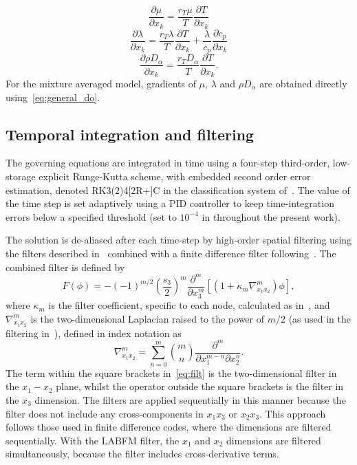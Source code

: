 \documentclass[notitlepage]{revtex4-1}
\begin{document}
\begin{equation}\frac{\partial\mu}{\partial{x}_{k}}=\frac{r_{T}\mu}{T}\frac{\partial{T}}{\partial{x}_{k}}\end{equation}
\begin{equation}\frac{\partial\lambda}{\partial{x}_{k}}=\frac{r_{T}\lambda}{T}\frac{\partial{T}}{\partial{x}_{k}}+\frac{\lambda}{c_{p}}\frac{\partial{c_{p}}}{\partial{x}_{k}}\end{equation}
\begin{equation}\frac{\partial\rho{D}_{\alpha}}{\partial{x}_{k}}=\frac{r_{T}D_{\alpha}}{T}\frac{\partial{T}}{\partial{x}_{k}}.\end{equation}
For the mixture averaged model, gradients of $\mu$, $\lambda$ and $\rho{D}_{\alpha}$ are obtained directly using~\eqref{eq:general_do}.

\subsection{Temporal integration and filtering}

The governing equations are integrated in time using a four-step third-order, low-storage explicit Runge-Kutta scheme, with embedded second order error estimation, denoted RK3(2)4[2R+]C in the classification system of~\citet{kennedy_2000}. The value of the time step is set adaptively using a PID controller to keep time-integration errors below a specified threshold (set to $10^{-4}$ in throughout the present work). 

The solution is de-aliased after each time-step by high-order spatial filtering using the filters described in~\cite{king_2022} combined with a finite difference filter following~\cite{kennedy_1994}. 
The combined filter is defined by
\begin{equation}F\left(\phi\right)=-\left(-1\right)^{m/2}\left(\frac{s_{3}}{2}\right)^{m}\frac{\partial^{m}}{\partial{x}_{3}^{m}}\left[\left(1+\kappa_{m}\nabla_{x_{1}x_{2}}^{m}\right)\phi\right]\label{eq:filt},\end{equation}
where $\kappa_{m}$ is the filter coefficient, specific to each node, calculated as in~\cite{king_2022}, and $\nabla_{x_{1}x_{2}}^{m}$ is the two-dimensional Laplacian raised to the power of $m/2$ (as used in the filtering in~\cite{king_2022}), defined in index notation as
\begin{equation}\nabla_{x_{1}x_{2}}^{m}=\displaystyle\sum_{n=0}^{m}{m\choose n}\frac{\partial^{m}}{\partial{x}_{1}^{m-n}\partial{x}_{2}^{n}}.\end{equation}
The term within the square brackets in~\eqref{eq:filt} is the two-dimensional filter in the $x_{1}-x_{2}$ plane, whilst the operator outside the square brackets is the filter in the $x_{3}$ dimension. The filters are applied sequentially in this manner because the filter does not include any cross-components in $x_{1}x_{3}$ or $x_{2}x_{3}$. This approach follows those used in finite difference codes, where the dimensions are filtered sequentially. With the LABFM filter, the $x_{1}$ and $x_{2}$ dimensions are filtered simultaneously, because the filter includes cross-derivative terms.
\end{document}
